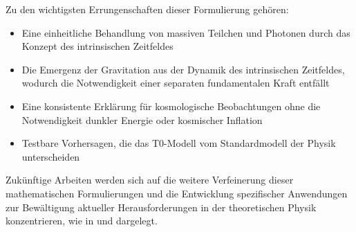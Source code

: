 \documentclass[12pt,a4paper]{article}
\theoremstyle{definition}
\theoremstyle{remark}
\begin{document}
	Zu den wichtigsten Errungenschaften dieser Formulierung gehören:
	\begin{itemize}
		\item Eine einheitliche Behandlung von massiven Teilchen und Photonen durch das Konzept des intrinsischen Zeitfeldes
		\item Die Emergenz der Gravitation aus der Dynamik des intrinsischen Zeitfeldes, wodurch die Notwendigkeit einer separaten fundamentalen Kraft entfällt
		\item Eine konsistente Erklärung für kosmologische Beobachtungen ohne die Notwendigkeit dunkler Energie oder kosmischer Inflation
		\item Testbare Vorhersagen, die das T0-Modell vom Standardmodell der Physik unterscheiden
	\end{itemize}
	
	Zukünftige Arbeiten werden sich auf die weitere Verfeinerung dieser mathematischen Formulierungen und die Entwicklung spezifischer Anwendungen zur Bewältigung aktueller Herausforderungen in der theoretischen Physik konzentrieren, wie in \cite{pascher_galaxies_2025} und \cite{pascher_feldtheorie_2025} dargelegt.
	
\end{document}
